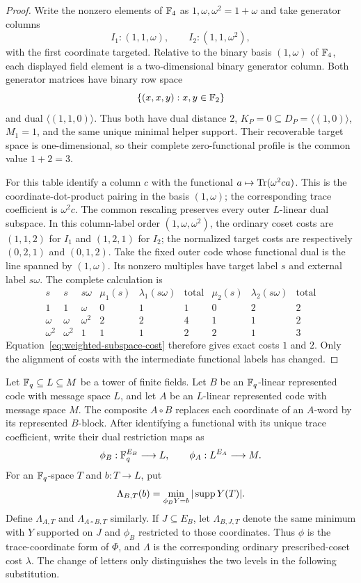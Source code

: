 \begin{proof}
Write the nonzero elements of $\mathbb F_4$ as
$1,\omega,\omega^2=1+\omega$ and take generator columns
\[
 I_1:(1,1,\omega),
 \qquad
 I_2:(1,1,\omega^2),
\]
with the first coordinate targeted.  Relative to the binary basis
$(1,\omega)$ of $\mathbb F_4$, each displayed field element is a two-dimensional
binary generator column.  Both generator matrices have binary row
space
\[
 \{(x,x,y):x,y\in\mathbb F_2\}
\]
and dual $\langle(1,1,0)\rangle$.  Thus both have dual distance $2$,
$K_P=0\subseteq D_P=\langle(1,0)\rangle$, $M_1=1$, and the same unique
minimal helper support.  Their recoverable target space is one-dimensional,
so their complete zero-functional profile is the common value $1+2=3$.

For this table identify a column $c$ with the functional
$a\mapsto\operatorname{Tr}(\omega^2ca)$.  This is the coordinate-dot-product pairing
in the basis $(1,\omega)$; the corresponding trace coefficient is
$\omega^2c$.  The common rescaling preserves every outer $L$-linear dual
subspace.  In this column-label order $(1,\omega,\omega^2)$, the ordinary coset costs are
$(1,1,2)$ for $I_1$ and $(1,2,1)$ for $I_2$; the normalized target costs are
respectively $(0,2,1)$ and $(0,1,2)$.  Take the fixed outer code whose
functional dual is the line spanned by $(1,\omega)$.  Its nonzero multiples
have target label $s$ and external label $s\omega$.  The complete calculation
is
\[
\begin{array}{c|cc|ccc|ccc}
 s & s & s\omega
   & \mu_1(s) & \lambda_1(s\omega) & \text{total}
   & \mu_2(s) & \lambda_2(s\omega) & \text{total}\\ \hline
 1        & 1        & \omega   & 0&1&1 & 0&2&2\\
 \omega   & \omega   & \omega^2 & 2&2&4 & 1&1&2\\
 \omega^2 & \omega^2 & 1        & 1&1&2 & 2&1&3
\end{array}
\]
Equation~\eqref{eq:weighted-subspace-cost} therefore gives exact costs $1$
and $2$.  Only the alignment of costs with the intermediate functional labels
has changed.
%
%
\end{proof}

Let $\mathbb F_q\subseteq L\subseteq M$ be a tower of finite fields.  Let $B$ be an
$\mathbb F_q$-linear represented code with message space $L$, and let $A$ be an
$L$-linear represented code with message space $M$.  The composite $A\circ B$
replaces each coordinate of an $A$-word by its represented $B$-block.
After identifying a functional with its unique trace coefficient, write their
dual restriction maps as
\[
 \phi_B:\mathbb F_q^{E_B}\longrightarrow L,
 \qquad
 \phi_A:L^{E_A}\longrightarrow M.
\]
For an $\mathbb F_q$-space $T$ and $b:T\to L$, put
\[
 \Lambda_{B,T}(b)=
 \min_{\phi_BY=b}|\operatorname{supp} Y(T)|.
\]
Define $\Lambda_{A,T}$ and $\Lambda_{A\circ B,T}$ similarly.  If
$J\subseteq E_B$, let $\Lambda_{B,J,T}$ denote the same minimum with $Y$
supported on $J$ and $\phi_B$ restricted to those coordinates.
Thus $\phi$ is the trace-coordinate form of $\Phi$, and $\Lambda$ is the
corresponding ordinary prescribed-coset cost $\lambda$.  The change of letters
only distinguishes the two levels in the following substitution.

